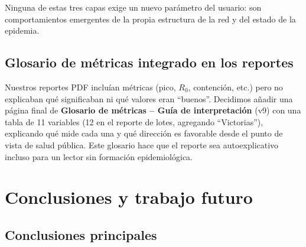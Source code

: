 \documentclass[spanish,notitlepage,letterpaper, 12pt]{article}
\begin{document}
Ninguna de estas tres capas exige un nuevo par\'ametro del usuario: son comportamientos emergentes de la propia estructura de la red y del estado de la epidemia.

\subsection{Glosario de m\'etricas integrado en los reportes}

Nuestros reportes PDF inclu\'ian m\'etricas (pico, $R_0$, contenci\'on, etc.) pero no explicaban qu\'e significaban ni qu\'e valores eran ``buenos''. Decidimos a\~nadir una p\'agina final de \textbf{Glosario de m\'etricas -- Gu\'ia de interpretaci\'on} (v9) con una tabla de 11 variables (12 en el reporte de lotes, agregando ``Victorias''), explicando qu\'e mide cada una y qu\'e direcci\'on es favorable desde el punto de vista de salud p\'ublica. Este glosario hace que el reporte sea autoexplicativo incluso para un lector sin formaci\'on epidemiol\'ogica.

\newpage
\section{Conclusiones y trabajo futuro}
\label{sec:conclusiones}

\subsection{Conclusiones principales}
\end{document}
